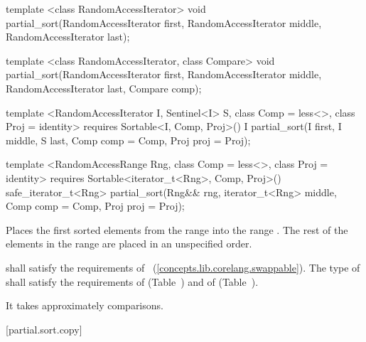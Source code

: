 %
\begin{removedblock}
\begin{itemdecl}
template <class RandomAccessIterator>
  void partial_sort(RandomAccessIterator first,
                    RandomAccessIterator middle,
                    RandomAccessIterator last);

template <class RandomAccessIterator, class Compare>
  void partial_sort(RandomAccessIterator first,
                    RandomAccessIterator middle,
                    RandomAccessIterator last,
                    Compare comp);
\end{itemdecl}
\end{removedblock}
\begin{addedblock}
\begin{itemdecl}
template <RandomAccessIterator I, Sentinel<I> S, class Comp = less<>,
    class Proj = identity>
  requires Sortable<I, Comp, Proj>()
  I partial_sort(I first, I middle, S last, Comp comp = Comp{}, Proj proj = Proj{});

template <RandomAccessRange Rng, class Comp = less<>, class Proj = identity>
  requires Sortable<iterator_t<Rng>, Comp, Proj>()
  safe_iterator_t<Rng>
    partial_sort(Rng&& rng, iterator_t<Rng> middle, Comp comp = Comp{},
                 Proj proj = Proj{});
\end{itemdecl}
\end{addedblock}

\begin{itemdescr}
\pnum
\effects
Places the first
sorted elements from the range
into the range
.
The rest of the elements in the range
are placed in an unspecified order.
%

\begin{removedblock}
\pnum
\requires
{} shall satisfy the requirements of
~(\ref{concepts.lib.corelang.swappable}). The type
of  shall satisfy the requirements of
 (Table~) and of
 (Table~).
\end{removedblock}

\pnum
\complexity
It takes approximately
comparisons.
\end{itemdescr}

[partial.sort.copy]{}


